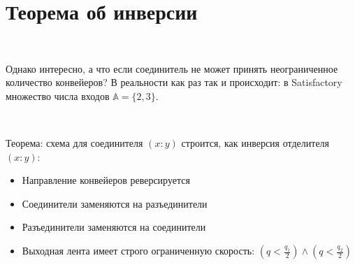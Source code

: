 \vspace{0.5in}

\section{Теорема об инверсии}

\

Однако интересно, а что если соединитель не может принять неограниченное количество конвейеров? В реальности как раз так и происходит: в Satisfactory множество числа входов $\mathbb{A} = \{ 2, 3 \}$. 

\

\noindent Теорема: схема для соединителя $(x:y)$ строится, как инверсия отделителя $(x:y)$:

\begin{itemize}
	\item Направление конвейеров реверсируется
	
	\item Соединители заменяются на разъединители
	
	\item Разъединители заменяются на соединители
	
	\item Выходная лента имеет строго ограниченную скорость: $(q < \frac{q_1}2) \land (q < \frac{q_2}2)$
\end{itemize}





\vspace{0.5in}

